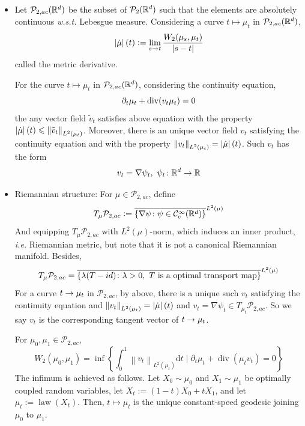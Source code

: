 \documentclass[a4paper,12pt]{article}
\begin{document}
\begin{itemize}
  \item Let $\mathcal{P}_{2,ac}(\mathbb{R}^d)$ be the subset of $\mathcal{P}_2(\mathbb{R}^d)$ such that the elements are absolutely continuous \emph{w.s.t.} Lebesgue measure. Considering a curve $t \mapsto \mu_t$ in $\mathcal{P}_{2,ac}(\mathbb{R}^d)$,
  \begin{equation*}
    \left\lvert\dot{\mu}\right\lvert(t) \vcentcolon= \lim_{s \rightarrow t} \frac{W_2(\mu_s,\mu_t)}{\left\lvert s-t\right\lvert}
  \end{equation*}
  called the metric derivative.

  \noindent For the curve $t \mapsto \mu_t$ in $\mathcal{P}_{2,ac}(\mathbb{R}^d)$, considering the continuity equation,
  \begin{equation*}
    \partial_t \mu_t + \operatorname{div}(v_t\mu_t) = 0
  \end{equation*}
  the any vector field $\tilde{v}_t$ satisfies above equation with the property $\left\lvert\dot{\mu}\right\lvert(t) \leqslant \left\lVert\tilde{v}_t\right\lVert_{L^2(\mu_t)}$. Moreover, there is an unique vector field $v_t$ satisfying the continuity equation and with the property $\left\lVert{v}_t\right\lVert_{L^2(\mu_t)} = \left\lvert\dot{\mu}\right\lvert(t)$. Such $v_t$ has the form
  \begin{equation*}
    v_t = \nabla \psi_t,~\psi_t \colon \mathbb{R}^d \rightarrow \mathbb{R}
  \end{equation*}

  \item Riemannian structure: For $\mu \in \mathcal{P}_{2,ac}$, define
  \begin{equation*}
    T_\mu \mathcal{P}_{2,ac} \vcentcolon= \overline{\left\{\nabla \psi \colon \psi \in \mathcal{C}_c^\infty(\mathbb{R}^d)\right\}}^{L^2(\mu)}
  \end{equation*}
  And equipping $ T_\mu \mathcal{P}_{2,ac}$ with $L^2(\mu)$-norm, which induces an inner product, \emph{i.e.} Riemannian metric, but note that it is not a canonical Riemannian manifold. Besides,
  \begin{equation*}
    T_\mu \mathcal{P}_{2,ac} = \overline{\left\{\lambda(T-id) \colon \lambda > 0,~T \text{ is a optimal transport map}\right\}}^{L^2(\mu)}
  \end{equation*}
  For a curve $t \rightarrow \mu_t$ in $\mathcal{P}_{2,ac}$, by above, there is a unique such $v_t$ satisfying the continuity equation and $\left\lVert{v}_t\right\lVert_{L^2(\mu_t)} = \left\lvert\dot{\mu}\right\lvert(t)$ and $v_t = \nabla \psi_t \in T_{\mu_t} \mathcal{P}_{2,ac}$. So we say $v_t$ is the corresponding tangent vector of $t \rightarrow \mu_t$.

  \begin{thm}
    For $\mu_0,\mu_1 \in \mathcal{P}_{2,ac}$,
    \begin{equation*}
      W_2\left(\mu_0, \mu_1\right)=\inf \left\{\int_0^1\left\|v_t\right\|_{L^2\left(\mu_t\right)} \mathrm{d} t \mid \partial_t \mu_t+\operatorname{div}\left(\mu_t v_t\right)=0\right\}
    \end{equation*}
    The infimum is achieved as follows. Let $X_0 \sim \mu_0$ and $X_1 \sim \mu_1$ be optimally coupled random variables, let $X_t:=(1-t) X_0+t X_1$, and let $\mu_t:=\operatorname{law}\left(X_t\right)$. Then, $t \mapsto \mu_t$ is the unique constant-speed geodesic joining $\mu_0$ to $\mu_1$.
  \end{thm}


\end{itemize}
\end{document}
